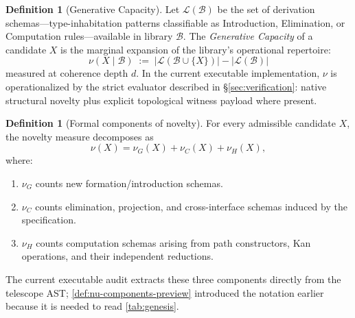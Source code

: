 \documentclass[11pt,a4paper]{article}
\theoremstyle{plain}
\theoremstyle{definition}
\newtheorem{definition}[theorem]{Definition}
\theoremstyle{remark}
\begin{document}
\begin{definition}[Generative Capacity]
\label{def:novelty}
Let $\mathcal{L}(\mathcal{B})$ be the set of derivation schemas---type-inhabitation patterns classifiable as Introduction, Elimination, or Computation rules---available in library $\mathcal{B}$.
The \emph{Generative Capacity} of a candidate $X$ is the marginal expansion of the library's operational repertoire:
\begin{equation}
    \nu(X \mid \mathcal{B}) \;:=\; |\mathcal{L}(\mathcal{B} \cup \{X\})| - |\mathcal{L}(\mathcal{B})|
\end{equation}
measured at coherence depth $d$.
In the current executable implementation, $\nu$ is operationalized by the strict evaluator described in \S\ref{sec:verification}: native structural novelty plus explicit topological witness payload where present.
\end{definition}

\begin{definition}[Formal components of novelty]
\label{def:nu-components}
For every admissible candidate $X$, the novelty measure decomposes as
\[
  \nu(X) = \nu_G(X) + \nu_C(X) + \nu_H(X),
\]
where:
\begin{enumerate}[nosep]
    \item $\nu_G$ counts new formation/introduction schemas.
    \item $\nu_C$ counts elimination, projection, and cross-interface schemas induced by the specification.
    \item $\nu_H$ counts computation schemas arising from path constructors, Kan operations, and their independent reductions.
\end{enumerate}
The current executable audit extracts these three components directly from the telescope AST; \cref{def:nu-components-preview} introduced the notation earlier because it is needed to read \cref{tab:genesis}.
\end{definition}
\end{document}
